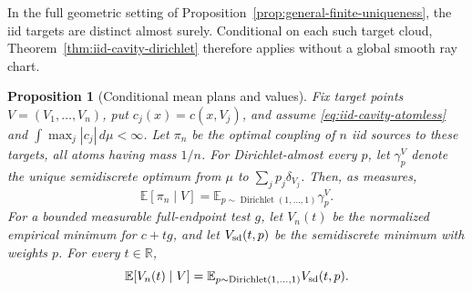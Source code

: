 \documentclass[11pt,reqno]{amsart}
\newtheorem{proposition}[theorem]{Proposition}
\theoremstyle{definition}
\theoremstyle{remark}
\numberwithin{equation}{section}
\newcommand{\R}{\mathbb R}
\newcommand{\E}{\mathbb E}
\begin{document}
In the full geometric setting of
Proposition~\ref{prop:general-finite-uniqueness}, the iid targets are
distinct almost surely. Conditional on each such target cloud,
Theorem~\ref{thm:iid-cavity-dirichlet} therefore applies without a
global smooth ray chart.

\begin{proposition}[Conditional mean plans and values]
\label{prop:iid-cavity-mean}
Fix target points \(V=(V_1,\ldots,V_n)\), put
\(c_j(x)=c(x,V_j)\), and assume
\eqref{eq:iid-cavity-atomless} and
\(\int\max_j|c_j|\,d\mu<\infty\). Let \(\pi_n\) be the
optimal coupling of \(n\) iid sources to these targets, all atoms
having mass \(1/n\). For Dirichlet-almost every \(p\), let
\(\gamma_p^V\) denote the unique semidiscrete optimum from \(\mu\)
to \(\sum_jp_j\delta_{V_j}\). Then, as measures,
\begin{equation}
\label{eq:iid-cavity-mean-plan}
 \E[\pi_n\mid V]
   =\E_{p\sim\operatorname{Dirichlet}(1,\ldots,1)}\gamma_p^V.
\end{equation}
For a bounded measurable full-endpoint test \(g\), let \(V_n(t)\)
be the normalized empirical minimum for \(c+tg\), and let
\(V_{\rm sd}(t,p)\) be the semidiscrete minimum with weights \(p\).
For every \(t\in\R\),
\begin{equation}
\label{eq:iid-cavity-pressure}
 \E[V_n(t)\mid V]
   =\E_{p\sim\operatorname{Dirichlet}(1,\ldots,1)}
                   V_{\rm sd}(t,p).
\end{equation}
\end{proposition}
\end{document}

